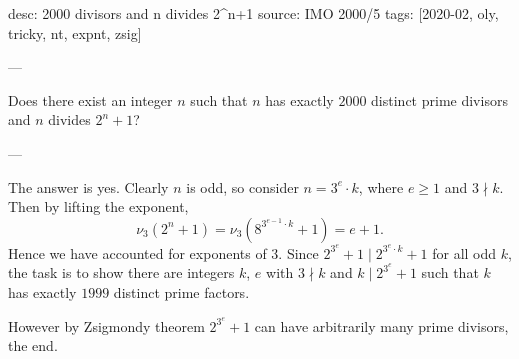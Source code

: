 desc: 2000 divisors and n divides 2^n+1
source: IMO 2000/5
tags: [2020-02, oly, tricky, nt, expnt, zsig]

---

Does there exist an integer $n$ such that $n$ has exactly $2000$ distinct prime divisors and $n$ divides $2^n+1$?

---

The answer is yes. Clearly $n$ is odd, so consider $n=3^e\cdot k$, where $e\ge1$ and $3\nmid k$. Then  by lifting the exponent, \[\nu_3\left(2^n+1\right)=\nu_3\left(8^{3^{e-1}\cdot k}+1\right)=e+1.\]
Hence we have accounted for exponents of $3$. Since $2^{3^e}+1\mid2^{3^e\cdot k}+1$ for all odd $k$, the task is to show there are integers $k$, $e$ with $3\nmid k$ and $k\mid2^{3^e}+1$ such that $k$ has exactly $1999$ distinct prime factors.

However by Zsigmondy theorem $2^{3^e}+1$ can have arbitrarily many prime divisors, the end.

